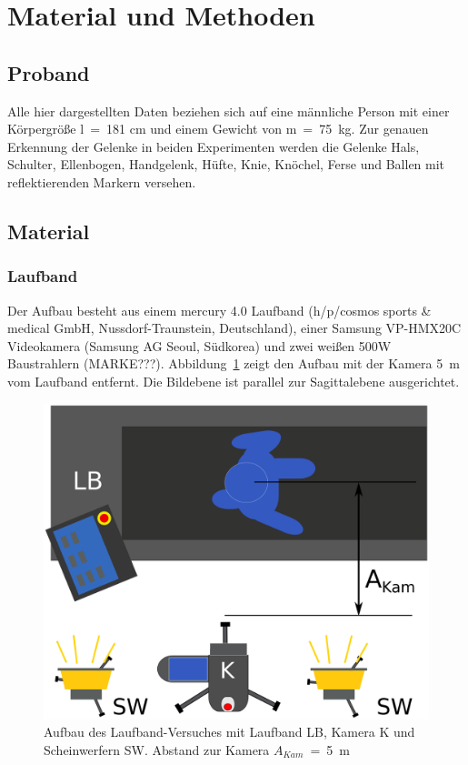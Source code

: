 \section{Material und Methoden}

\subsection{Proband}
Alle hier dargestellten Daten beziehen sich auf eine männliche Person mit einer Körpergröße l~=~181 cm und einem Gewicht von m~=~75~kg. Zur genauen Erkennung der Gelenke in beiden Experimenten werden die Gelenke Hals, Schulter, Ellenbogen, Handgelenk, Hüfte, Knie, Knöchel, Ferse und Ballen mit reflektierenden Markern versehen.

\subsection{Material}
\subsubsection{Laufband}
Der Aufbau besteht aus einem mercury 4.0 Laufband (h/p/cosmos sports \& medical GmbH, Nussdorf-Traunstein, Deutschland), einer Samsung VP-HMX20C Videokamera (Samsung AG Seoul, Südkorea) und zwei weißen 500W Baustrahlern (MARKE???). Abbildung~\ref{fig:laufbnd_stp} zeigt den Aufbau mit der Kamera 5~m vom Laufband entfernt. Die Bildebene ist parallel zur Sagittalebene ausgerichtet.

\begin{figure}
	\includegraphics[width=\linewidth]{bilder/mat_met/Laufband_setup}
	\caption[Aufbau Laufband Versuch]{Aufbau des Laufband-Versuches mit Laufband LB, Kamera K und Scheinwerfern SW. Abstand zur Kamera $A_{Kam}$~=~5~m }
	\label{fig:laufbnd_stp}
\end{figure}


